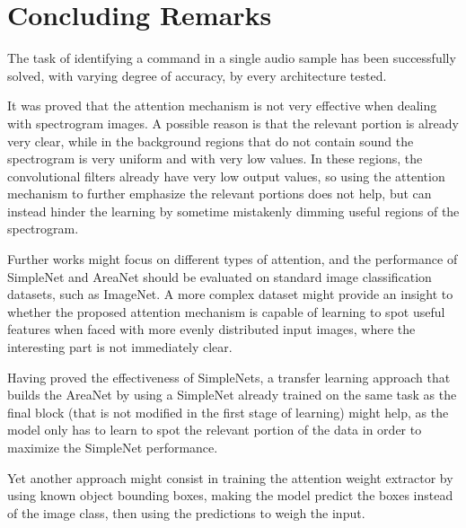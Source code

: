
\section{Concluding Remarks}
\label{sec:conclusions}

The task of identifying a command in a single audio sample has been successfully
solved, with varying degree of accuracy, by every architecture tested.

%
It was proved that the attention mechanism is not very effective when dealing
with spectrogram images.
%
A possible reason is that the relevant portion is already very clear, while in
the background regions that do not contain sound the spectrogram is very
uniform and with very low values.
%
In these regions, the convolutional filters already have very low output
values, so using the attention mechanism to further emphasize the relevant
portions does not help, but can instead hinder the learning by sometime
mistakenly dimming useful regions of the spectrogram.

Further works might focus on different types of attention, and the performance
of SimpleNet and AreaNet should be evaluated on standard image classification
datasets, such as ImageNet.
%
A more complex dataset might provide an insight to whether the proposed
attention mechanism is capable of learning to spot useful features when faced
with more evenly distributed input images, where the interesting part is not
immediately clear.

%
Having proved the effectiveness of SimpleNets, a transfer learning approach
that builds the AreaNet by using a SimpleNet already trained on the same task
as the final block (that is not modified in the first stage of learning) might
help, as the model only has to learn to spot the relevant portion of the data
in order to maximize the SimpleNet performance.

Yet another approach might consist in training the attention weight extractor
by using known object bounding boxes, making the model predict the boxes
instead of the image class, then using the predictions to weigh the input.



